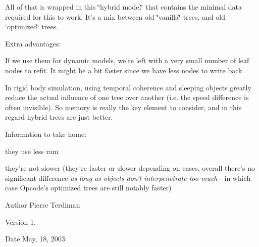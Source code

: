 All of that is wrapped in this \char`\"{}hybrid model\char`\"{} that contains the minimal data required for this to work. It's a mix between old \char`\"{}vanilla\char`\"{} trees, and old \char`\"{}optimized\char`\"{} trees.

Extra advantages\+:


\begin{DoxyItemize}
\item If we use them for dynamic models, we're left with a very small number of leaf nodes to refit. It might be a bit faster since we have less nodes to write back.
\item In rigid body simulation, using temporal coherence and sleeping objects greatly reduce the actual influence of one tree over another (i.\+e. the speed difference is often invisible). So memory is really the key element to consider, and in this regard hybrid trees are just better.
\end{DoxyItemize}

Information to take home\+:
\begin{DoxyItemize}
\item they use less ram
\item they're not slower (they're faster or slower depending on cases, overall there's no significant difference {\itshape as long as objects don't interpenetrate too much} -\/ in which case Opcode's optimized trees are still notably faster)
\end{DoxyItemize}

\begin{DoxyAuthor}{Author}
Pierre Terdiman 
\end{DoxyAuthor}
\begin{DoxyVersion}{Version}
1. 
\end{DoxyVersion}
\begin{DoxyDate}{Date}
May, 18, 2003 
\end{DoxyDate}


